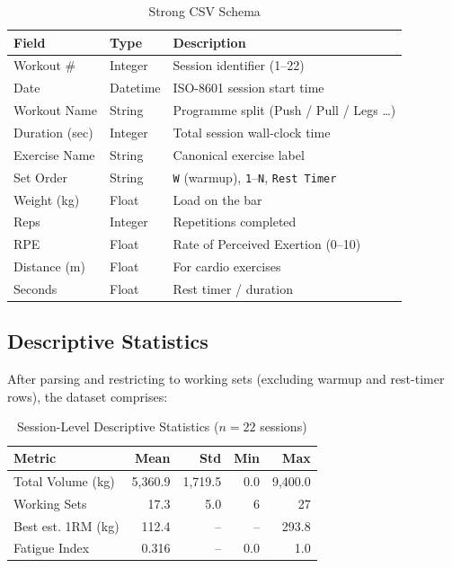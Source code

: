 \documentclass[12pt,a4paper]{report}
\theoremstyle{definition}
\begin{document}
\begin{table}[h!]
\centering
\caption{Strong CSV Schema}
\begin{tabular}{lll}
\toprule
\textbf{Field} & \textbf{Type} & \textbf{Description} \\
\midrule
Workout \#       & Integer & Session identifier (1--22) \\
Date             & Datetime & ISO-8601 session start time \\
Workout Name     & String  & Programme split (Push / Pull / Legs \ldots) \\
Duration (sec)   & Integer & Total session wall-clock time \\
Exercise Name    & String  & Canonical exercise label \\
Set Order        & String  & \texttt{W} (warmup), \texttt{1}--\texttt{N}, \texttt{Rest Timer} \\
Weight (kg)      & Float   & Load on the bar \\
Reps             & Integer & Repetitions completed \\
RPE              & Float   & Rate of Perceived Exertion (0--10) \\
Distance (m)     & Float   & For cardio exercises \\
Seconds          & Float   & Rest timer / duration \\
\bottomrule
\end{tabular}
\end{table}

\subsection{Descriptive Statistics}

After parsing and restricting to working sets (excluding warmup and rest-timer rows),
the dataset comprises:

\begin{table}[h!]
\centering
\caption{Session-Level Descriptive Statistics ($n = 22$ sessions)}
\begin{tabular}{lrrrr}
\toprule
\textbf{Metric} & \textbf{Mean} & \textbf{Std} & \textbf{Min} & \textbf{Max} \\
\midrule
Total Volume (kg)     & 5{,}360.9 & 1{,}719.5 & 0.0     & 9{,}400.0 \\
Working Sets          & 17.3      & 5.0       & 6       & 27 \\
Best est. 1RM (kg)    & 112.4     & --        & --      & 293.8 \\
Fatigue Index         & 0.316     & --        & 0.0     & 1.0 \\
\bottomrule
\end{tabular}
\end{table}
\end{document}
